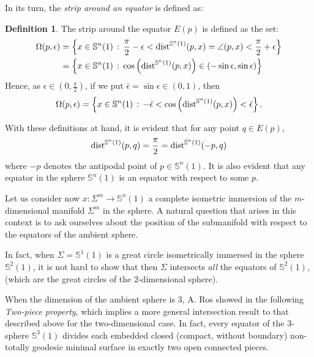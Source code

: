 \documentclass{amsart}
\theoremstyle{definition}
\newtheorem{definition}[theorem]{Definition}
\theoremstyle{remark}
\begin{document}
    In its turn, the {\em strip around an equator } is defined as:

\begin{definition}
The strip around the equator $E(p)$ is defined as the set:
    $$
\begin{aligned}
\Omega(p,\epsilon)&=\left\lbrace x\in \mathbb{S}^{n}(1)\, : \, \frac{\pi}{2}-\epsilon<{\rm dist}^{\mathbb{S}^{n}(1)}(p,x)=\angle{(p,x)}<\frac{\pi}{2}+\epsilon\right\rbrace\\&=\left\lbrace x\in \mathbb{S}^{n}(1)\, : \,   \cos\left({\rm dist}^{\mathbb{S}^{n}(1)}(p,x)\right)\in ( -\sin\epsilon,\sin\epsilon) \right\rbrace
\end{aligned}
$$
Hence, as $\epsilon \in (0,\frac{\pi}{2})$, if we put $\bar \epsilon=\sin \epsilon \in (0,1)$, then
$$
\Omega(p,\epsilon) =\left\lbrace x\in \mathbb{S}^{n}(1)\, : \, -\bar \epsilon<\cos\left({\rm dist}^{\mathbb{S}^{n}(1)}(p,x)\right)<\bar \epsilon\right\rbrace.
$$
\end{definition}

With these definitions at hand, it is evident that for any point $q\in E(p)$, 
        $$
{\rm dist}^{\mathbb{S}^n(1)}(p,q)=\frac{\pi}{2}={\rm dist}^{\mathbb{S}^n(1)}(-p,q)
        $$
where $-p$ denotes the antipodal point of $p \in \mathbb{S}^{n}(1)$. It is also evident  that any equator in the sphere $\mathbb{S}^n(1)$ is an equator with respect to some $p$.

     Let us consider now $x: \Sigma^m \to \mathbb{S}^n(1)$  a complete isometric immersion of the  $m$-dimensional manifold $\Sigma^m$ in the sphere.  A natural question that arises in this context is to ask ourselves about the position of the submanifold with respect to the equators of the ambient sphere. 

     In fact, when $\Sigma=\mathbb{S}^{1}(1)$ is a great circle isometrically immersed in the sphere $\mathbb{S}^{2}(1)$, it is not hard to show that then $\Sigma$ intersects {\em all} the equators of $ \mathbb{S}^{2}(1)$, (which are the great circles of the $2$-dimensional sphere).

     When the dimension of the ambient sphere is $3$, A. Ros showed in \cite{R} the following {\em Two-piece property}, which implies a more general intersection result to that described above for the two-dimensional case. In fact, every equator of the 3-sphere $\mathbb{S}^3(1)$ divides each embedded closed (compact, without boundary) non-totally geodesic minimal surface in exactly two open connected pieces.
\end{document}

